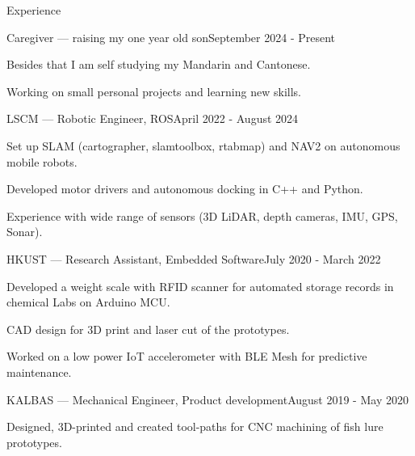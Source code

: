 \documentclass[
	a4paper, %
	11pt, %
]{resume} %
\begin{document}
\begin{rSection}{Experience}

	\begin{rSubsection}{Caregiver --- raising my one year old son}{September 2024 - Present}{}{}
		\item Besides that I am self studying my Mandarin and Cantonese.
		\item Working on small personal projects and learning new skills.
	\end{rSubsection}


	\begin{rSubsection}{LSCM --- Robotic Engineer, ROS}{April 2022 - August 2024}{}{}
		\item Set up SLAM (cartographer, slamtoolbox, rtabmap) and NAV2 on autonomous mobile robots.
		\item Developed motor drivers and autonomous docking in C++ and Python.
		\item Experience with wide range of sensors (3D LiDAR, depth cameras, IMU, GPS, Sonar).
	\end{rSubsection}


	\begin{rSubsection}{HKUST --- Research Assistant, Embedded Software}{July 2020 - March 2022}{}{}
		\item Developed a weight scale with RFID scanner for automated storage records in chemical Labs on Arduino MCU.
		\item CAD design for 3D print and laser cut of the prototypes.
		\item Worked on a low power IoT accelerometer with BLE Mesh for predictive maintenance.
	\end{rSubsection}


	\begin{rSubsection}{KALBAS --- Mechanical Engineer, Product development}{August 2019 - May 2020}{}{}
		\item Designed, 3D-printed and created tool-paths for CNC machining of fish lure prototypes.
	\end{rSubsection}

\end{rSection}



\end{document}
